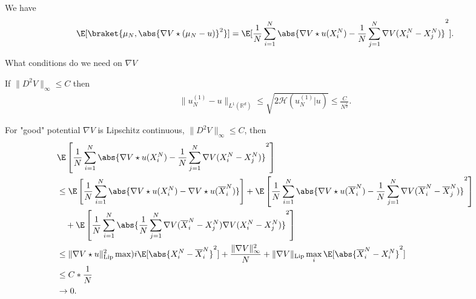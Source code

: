 We have 
\begin{align*} 
  \E[\braket{\mu_N , \abs{\nabla V \star (\mu_N - u)}^2}]  = \E[\frac{1}{N} \sum_{i=1}^{N} \abs{\nabla V \star  u (X_i^{N} ) - \frac{1}{N} \sum_{j=1}^{N} \nabla V (X_i^{N}-X_j^{N}  ) }^2 ]
.\end{align*}
\begin{note}
 What conditions do we need on $\nabla V$ 
\end{note}
\begin{theorem}
  If $\|D^2V\|_{\infty} \le  C$  then 
  \begin{align*}
    \|u_N^{(1)} - u \|_{L^{1}(\mathbb{R}^{d} ) } \le  \sqrt{2 \mathcal{H}(u_N^{(1)}|u)}  \le  \frac{C}{N^{\frac{1}{2}} }
  .\end{align*}
\end{theorem}
For "good" potential $\nabla V$ is Lipschitz continuous, $\|D^2 V\|_{\infty} \le  C$, then 
\begin{align*}
  &\E\left[\frac{1}{N} \sum_{i=1}^{N} \abs{\nabla V \star  u (X_i^{N} ) - \frac{1}{N} \sum_{j=1}^{N} \nabla V (X_i^{N}-X_j^{N}  ) }^2 \right] \\
  &\le  \E\left[\frac{1}{N} \sum_{i=1}^{N} \abs{\nabla V \star  u(X_i^{N}) - \nabla V \star  u(\overline{X}_i^{N}  )} \right] + \E\left[\frac{1}{N} \sum_{i=1}^{N} \abs{\nabla V \star  u(\overline{X}_i^{N}  ) - \frac{1}{N} \sum_{j=1}^{N} \nabla V(\overline{X}_i^{N} - \overline{X}_j^{N}    ) }^2 \right]\\
  &\quad +  \E\left[\frac{1}{N} \sum_{i=1}^{N} \abs{ \frac{1}{N} \sum_{j=1}^{N}\nabla V(\overline{X}_i^{N} - X_j^{N} ) \nabla V (X_i^{N} - X_j^{N}  )}^2 \right]  \\
  &\le \|\nabla V \star  u \|_{\text{Lip}}^{2} \max){i} \E[\abs{X_i^{N} -\overline{X}_i^{N}  }^2]  +  \frac{\|\nabla V\|^2_{\infty}}{N} + \|\nabla V\|_{\text{Lip}} \max_{i} \E[\abs{\overline{X}^{N}_i - X_i^{N}   }^2]\\
  &\le  C*\frac{1}{N} \\
  &\to 0
.\end{align*}
